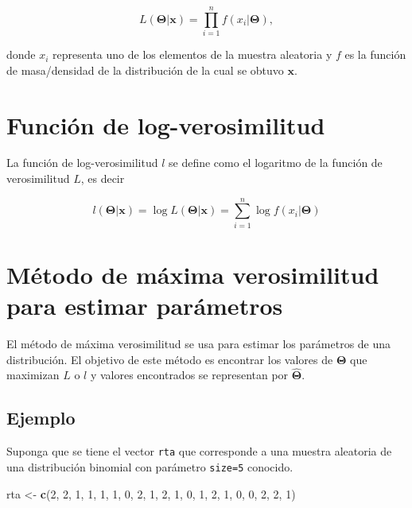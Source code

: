 \documentclass[10pt,]{krantz}
\makeatletter
\newenvironment{Shaded}{\begin{snugshade}}{\end{snugshade}}
\newcommand{\KeywordTok}[1]{\textcolor[rgb]{0.13,0.29,0.53}{\textbf{#1}}}
\newcommand{\DecValTok}[1]{\textcolor[rgb]{0.00,0.00,0.81}{#1}}
\newcommand{\StringTok}[1]{\textcolor[rgb]{0.31,0.60,0.02}{#1}}
\newcommand{\NormalTok}[1]{#1}
\newenvironment{kframe}{%
\medskip{}
\setlength{\fboxsep}{.8em}
 \def\at@end@of@kframe{}%
 \ifinner\ifhmode%
  \def\at@end@of@kframe{\end{minipage}}%
  \begin{minipage}{\columnwidth}%
 \fi\fi%
 \def\FrameCommand##1{\hskip\@totalleftmargin \hskip-\fboxsep
 \colorbox{shadecolor}{##1}\hskip-\fboxsep
     \hskip-\linewidth \hskip-\@totalleftmargin \hskip\columnwidth}%
 \MakeFramed {\advance\hsize-\width
   \@totalleftmargin\z@ \linewidth\hsize
   \@setminipage}}%
 {\par\unskip\endMakeFramed%
 \at@end@of@kframe}
\renewenvironment{Shaded}{\begin{kframe}}{\end{kframe}}
\makeatother
\begin{document}
\begin{equation}
L(\boldsymbol{\Theta} | \boldsymbol{x}) = \prod_{i=1}^{n}  f(x_i | \boldsymbol{\Theta}),
\label{eq:lik}
\end{equation}

donde \(x_i\) representa uno de los elementos de la muestra aleatoria y
\(f\) es la función de masa/densidad de la distribución de la cual se
obtuvo \(\boldsymbol{x}\).

\section{Función de
log-verosimilitud}\label{funcion-de-log-verosimilitud}

La función de log-verosimilitud \(l\) se define como el logaritmo de la
función de verosimilitud \(L\), es decir

\begin{equation}
l(\boldsymbol{\Theta} | \boldsymbol{x}) = \log L(\boldsymbol{\Theta} | \boldsymbol{x}) = \sum_{i=1}^{n} \log f(x_i | \boldsymbol{\Theta})
\label{eq:loglik}
\end{equation}

\section{Método de máxima verosimilitud para estimar
parámetros}\label{metodo-de-maxima-verosimilitud-para-estimar-parametros}

El método de máxima verosimilitud se usa para estimar los parámetros de
una distribución. El objetivo de este método es encontrar los valores de
\(\boldsymbol{\Theta}\) que maximizan \(L\) o \(l\) y valores
encontrados se representan por \(\hat{\boldsymbol{\Theta}}\).

\subsection*{Ejemplo}\label{ejemplo-49}


Suponga que se tiene el vector \texttt{rta} que corresponde a una
muestra aleatoria de una distribución binomial con parámetro
\texttt{size=5} conocido.

\begin{Shaded}
\begin{Highlighting}[]
\NormalTok{rta <-}\StringTok{ }\KeywordTok{c}\NormalTok{(}\DecValTok{2}\NormalTok{, }\DecValTok{2}\NormalTok{, }\DecValTok{1}\NormalTok{, }\DecValTok{1}\NormalTok{, }\DecValTok{1}\NormalTok{, }\DecValTok{1}\NormalTok{, }\DecValTok{0}\NormalTok{, }\DecValTok{2}\NormalTok{, }\DecValTok{1}\NormalTok{, }\DecValTok{2}\NormalTok{,}
         \DecValTok{1}\NormalTok{, }\DecValTok{0}\NormalTok{, }\DecValTok{1}\NormalTok{, }\DecValTok{2}\NormalTok{, }\DecValTok{1}\NormalTok{, }\DecValTok{0}\NormalTok{, }\DecValTok{0}\NormalTok{, }\DecValTok{2}\NormalTok{, }\DecValTok{2}\NormalTok{, }\DecValTok{1}\NormalTok{)}
\end{Highlighting}
\end{Shaded}
\end{document}
